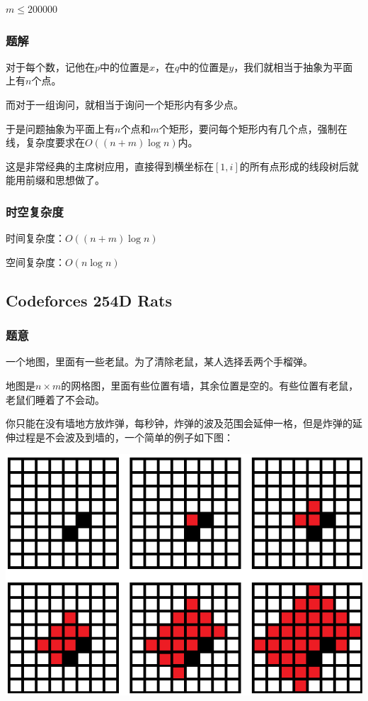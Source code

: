 \documentclass{ctexart}
\begin{document}
$m \le 200000$
\subsubsection{题解}
对于每个数，记他在$p$中的位置是$x$，在$q$中的位置是$y$，我们就相当于抽象为平面上有$n$个点。

而对于一组询问，就相当于询问一个矩形内有多少点。

于是问题抽象为平面上有$n$个点和$m$个矩形，要问每个矩形内有几个点，强制在线，复杂度要求在$O((n+m) \log n)$内。

这是非常经典的主席树应用，直接得到横坐标在$[1,i]$的所有点形成的线段树后就能用前缀和思想做了。
\subsubsection{时空复杂度}
时间复杂度：$O((n+m) \log n)$

空间复杂度：$O(n \log n)$
\subsection{Codeforces 254D Rats}
\subsubsection{题意}
一个地图，里面有一些老鼠。为了清除老鼠，某人选择丢两个手榴弹。

地图是$n \times m$的网格图，里面有些位置有墙，其余位置是空的。有些位置有老鼠，老鼠们睡着了不会动。

你只能在没有墙地方放炸弹，每秒钟，炸弹的波及范围会延伸一格，但是炸弹的延伸过程是不会波及到墙的，一个简单的例子如下图：

\includegraphics{rats.png}
\end{document}
